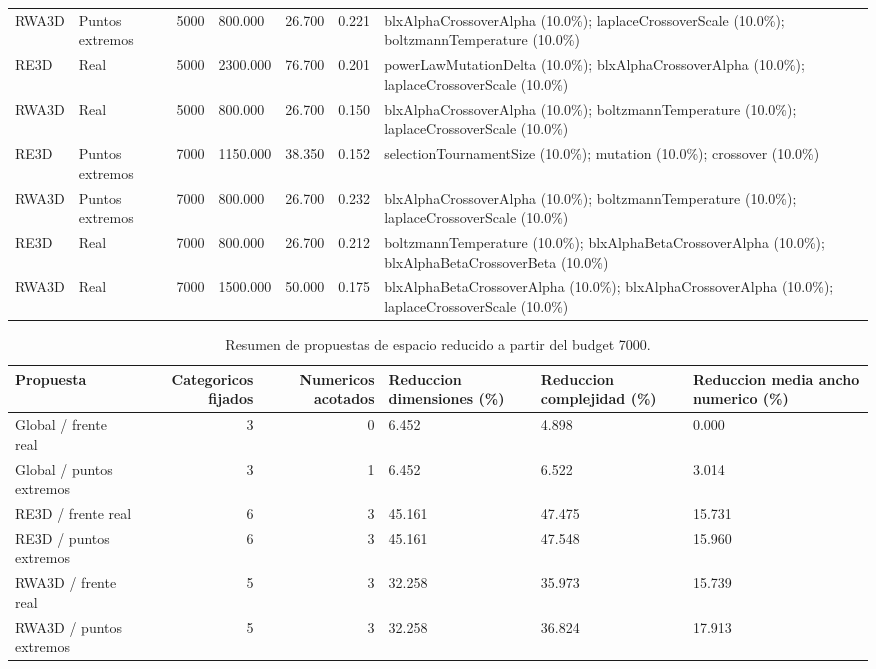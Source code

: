 \documentclass[11pt,a4paper]{article}
\begin{document}
{\begin{longtable}{llrllll}
RWA3D & Puntos extremos & 5000 & 800.000 & 26.700 & 0.221 & blxAlphaCrossoverAlpha (10.0\%); laplaceCrossoverScale (10.0\%); boltzmannTemperature (10.0\%) \\
RE3D & Real & 5000 & 2300.000 & 76.700 & 0.201 & powerLawMutationDelta (10.0\%); blxAlphaCrossoverAlpha (10.0\%); laplaceCrossoverScale (10.0\%) \\
RWA3D & Real & 5000 & 800.000 & 26.700 & 0.150 & blxAlphaCrossoverAlpha (10.0\%); boltzmannTemperature (10.0\%); laplaceCrossoverScale (10.0\%) \\
RE3D & Puntos extremos & 7000 & 1150.000 & 38.350 & 0.152 & selectionTournamentSize (10.0\%); mutation (10.0\%); crossover (10.0\%) \\
RWA3D & Puntos extremos & 7000 & 800.000 & 26.700 & 0.232 & blxAlphaCrossoverAlpha (10.0\%); boltzmannTemperature (10.0\%); laplaceCrossoverScale (10.0\%) \\
RE3D & Real & 7000 & 800.000 & 26.700 & 0.212 & boltzmannTemperature (10.0\%); blxAlphaBetaCrossoverAlpha (10.0\%); blxAlphaBetaCrossoverBeta (10.0\%) \\
RWA3D & Real & 7000 & 1500.000 & 50.000 & 0.175 & blxAlphaBetaCrossoverAlpha (10.0\%); blxAlphaCrossoverAlpha (10.0\%); laplaceCrossoverScale (10.0\%) \\
\end{longtable}

}

{\scriptsize
\begin{table}[p]
\centering
\caption{Resumen de propuestas de espacio reducido a partir del budget 7000.}
\label{tab:reduced_space_summary}
\begin{tabular}{lrrlll}
\toprule
Propuesta & Categoricos fijados & Numericos acotados & Reduccion dimensiones (\%) & Reduccion complejidad (\%) & Reduccion media ancho numerico (\%) \\
\midrule
Global / frente real & 3 & 0 & 6.452 & 4.898 & 0.000 \\
Global / puntos extremos & 3 & 1 & 6.452 & 6.522 & 3.014 \\
RE3D / frente real & 6 & 3 & 45.161 & 47.475 & 15.731 \\
RE3D / puntos extremos & 6 & 3 & 45.161 & 47.548 & 15.960 \\
RWA3D / frente real & 5 & 3 & 32.258 & 35.973 & 15.739 \\
RWA3D / puntos extremos & 5 & 3 & 32.258 & 36.824 & 17.913 \\
\bottomrule
\end{tabular}
\end{table}

}
\end{document}
